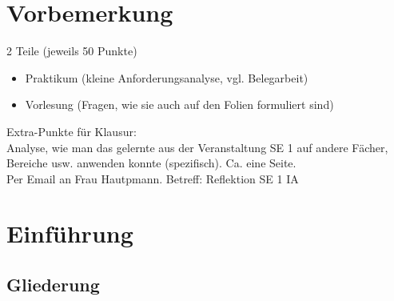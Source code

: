 \newcommand{\customDir}{../}








%



\maketitle
\newpage
\tableofcontents
\newpage
\chapter*{Vorbemerkung}
2 Teile (jeweils 50 Punkte)
\begin{itemize}
\item Praktikum (kleine Anforderungsanalyse, vgl. Belegarbeit)
\item Vorlesung (Fragen, wie sie auch auf den Folien formuliert sind)
\end{itemize}
Extra-Punkte für Klausur:\\
Analyse, wie man das gelernte aus der Veranstaltung SE 1 auf andere Fächer, Bereiche usw. anwenden konnte (spezifisch). Ca. eine Seite.\\
Per Email an Frau Hautpmann. Betreff: Reflektion SE 1 IA

\chapter{Einführung}

\section{Gliederung}

